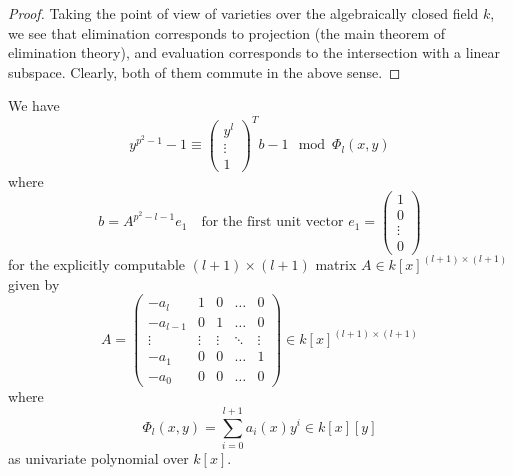 \begin{proof}
    Taking the point of view of varieties over the algebraically closed field $k$, we see that elimination corresponds to projection (the main theorem of elimination theory), and evaluation corresponds to the intersection with a linear subspace.
    Clearly, both of them commute in the above sense.
\end{proof}
\begin{lemma}
    \label{prop:symbolic_elimination}
    We have
    \begin{equation*}
        y^{p^2 - 1} - 1 \equiv \left(\begin{matrix*}
            y^l \\
            \vdots \\
            1
        \end{matrix*}\right)^T b - 1 \mod \Phi_l(x, y)
    \end{equation*}
    where
    \begin{equation*}
        b = A^{p^2 - l - 1} e_1 \quad \text{for the first unit vector $e_1 = \left(\begin{matrix*}
            1 \\
            0 \\
            \vdots \\
            0
        \end{matrix*}\right)$}
    \end{equation*}
    for the explicitly computable $(l + 1) \times (l + 1)$ matrix $A \in k[x]^{(l + 1) \times (l + 1)}$ given by
    \begin{equation*}
        A = \left( \begin{matrix*}
            -a_l & 1 & 0 & \dots & 0 \\
            -a_{l - 1} & 0 & 1 & \dots & 0 \\
            \vdots & \vdots & \vdots & \ddots & \vdots \\
            -a_1 & 0 & 0 & \dots & 1 \\
            -a_0 & 0 & 0 & \dots & 0
        \end{matrix*} \right) \in k[x]^{(l + 1) \times (l + 1)}
    \end{equation*}
    where
    \begin{equation*}
        \Phi_l(x, y) = \sum_{i = 0}^{l + 1} a_i(x) y^i \in k[x][y]
    \end{equation*}
    as univariate polynomial over $k[x]$.
\end{lemma}
